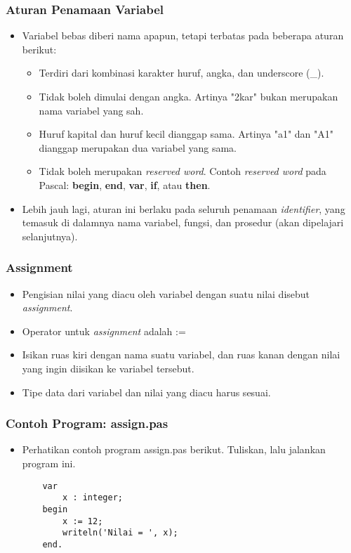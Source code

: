 \documentclass{beamer}
\begin{document}
\begin{frame}
\frametitle{Aturan Penamaan Variabel}
\begin{itemize}
	\item Variabel bebas diberi nama apapun, tetapi terbatas pada beberapa aturan berikut:
	\begin{itemize}
		\item Terdiri dari kombinasi karakter huruf, angka, dan underscore (\_).
		\item Tidak boleh dimulai dengan angka. Artinya "2kar" bukan merupakan nama variabel yang sah.
		\item Huruf kapital dan huruf kecil dianggap sama. Artinya "a1" dan "A1" dianggap merupakan dua variabel yang sama.
		\item Tidak boleh merupakan \alert{\textit{reserved word}}. Contoh \textit{reserved word} pada Pascal: \textbf{begin}, \textbf{end}, \textbf{var}, \textbf{if}, atau \textbf{then}.
	\end{itemize}
	\item Lebih jauh lagi, aturan ini berlaku pada seluruh penamaan \alert{\textit{identifier}}, yang temasuk di dalamnya nama variabel, fungsi, dan prosedur (akan dipelajari selanjutnya).
\end{itemize}
\end{frame}

\begin{frame}
\frametitle{Assignment}
\begin{itemize}
	\item Pengisian nilai yang diacu oleh variabel dengan suatu nilai disebut \alert{\textit{assignment}}.
	\item Operator untuk \textit{assignment} adalah :=
	\item Isikan ruas kiri dengan nama suatu variabel, dan ruas kanan dengan nilai yang ingin diisikan ke variabel tersebut.
	\item Tipe data dari variabel dan nilai yang diacu \alert{harus sesuai}.
\end{itemize}
\end{frame}


\begin{frame}[fragile]
\frametitle{Contoh Program: assign.pas}
\begin{itemize}
	\item Perhatikan contoh program assign.pas berikut. Tuliskan, lalu jalankan program ini.
	\begin{lstlisting}
	var
	    x : integer;
	begin
	    x := 12;
	    writeln('Nilai = ', x);
	end.
	\end{lstlisting}
\end{itemize}
\end{frame}
\end{document}

